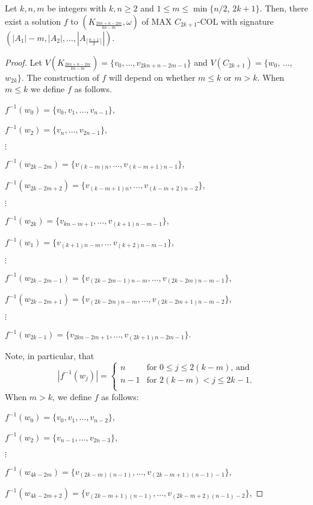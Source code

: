 \documentclass[11pt,a4paper]{article}
\begin{document}
\begin{lemma}
\label{lem:solalpha}
Let $k,n,m$ be integers with $k,n \geq 2$ and $1 \leq m \leq \min\{n/2$, $2k+1\}$. Then, there exist a solution $f$ to $(K_{\frac{2kn+n-2m}{kn-m}},\omega)$ of MAX $C_{2k+1}$-COL with signature $(|A_1|-m, |A_2|, \ldots,|A_{\lceil\frac{n+1}{2}\rceil}|)$. 
\end{lemma}

\begin{proof}
Let $V(K_{\frac{2kn+n-2m}{kn-m}}) = \{v_0,\ldots,v_{2kn+n-2m-1}\}$ and $V(C_{2k+1}) = \{w_0$, $\ldots$, $w_{2k}\}$. The construction of $f$ will depend on whether $m \leq k$ or $m > k$.
When $m \leq k$ we define $f$ as follows.

$f^{-1}(w_0) = \{v_0,v_1,\ldots,v_{n-1}\}$,

$f^{-1}(w_2) = \{v_{n},\ldots,v_{2n-1}\}$,

$\vdots$ 

$f^{-1}(w_{2k-2m}) = \{v_{(k-m)n},\ldots,v_{(k-m+1)n-1}\}$,

$f^{-1}(w_{2k-2m+2}) = \{v_{(k-m+1)n},\ldots,v_{(k-m+2)n-2}\}$,

$\vdots$

$f^{-1}(w_{2k}) = \{v_{kn-m+1},\ldots,v_{(k+1)n-m-1}\}$,

$f^{-1}(w_1) = \{v_{(k+1)n-m},\ldots\,v_{(k+2)n-m-1}\}$,

$\vdots$

$f^{-1}(w_{2k-2m-1}) = \{v_{(2k-2m-1)n-m},\ldots,v_{(2k-2m)n-m-1}\}$,

$f^{-1}(w_{2k-2m+1}) = \{v_{(2k-2m)n-m},\ldots,v_{(2k-2m+1)n-m-2}\}$,

$\vdots$

$f^{-1}(w_{2k-1}) =\{v_{2kn-2m+1},\ldots,v_{(2k+1)n-2m-1}\}$.

\noindent
Note, in particular, that
\[
|f^{-1}(w_j)| = \begin{cases}
  n & \text{for $0 \leq j \leq 2(k-m)$, and} \\
  n-1 & \text{for $2(k-m) < j \leq 2k-1$.} \\
\end{cases}
\]
When $m > k$, we define $f$ as follows:

$f^{-1}(w_0) = \{v_0,v_1,\ldots,v_{n-2}\}$, 

$f^{-1}(w_2) = \{v_{n-1},\ldots,v_{2n-3}\}$,

$\vdots$ 

$f^{-1}(w_{4k-2m}) = \{v_{(2k-m)(n-1)},\ldots,v_{(2k-m+1)(n-1)-1}\}$,

$f^{-1}(w_{4k-2m+2}) = \{v_{(2k-m+1)(n-1)},\ldots,v_{(2k-m+2)(n-1)-2}\}$,


\end{proof}
\end{document}
